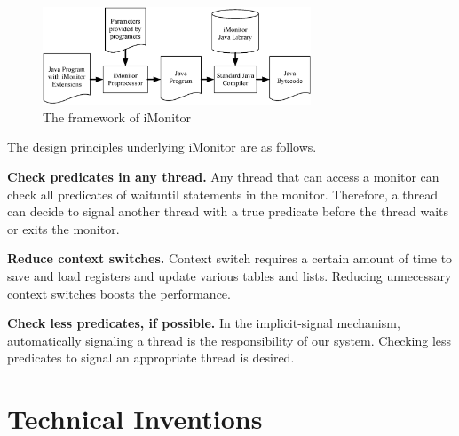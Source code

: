 \documentclass[preprint]{sigplanconf}
\begin{document}
\begin{figure}[ht!]
  \centering
  \includegraphics[width=80mm]{fig/flow.eps}
  \caption{The framework of iMonitor}
  \label{fig:fw}
\end{figure}




The design principles underlying iMonitor are as follows.

\begin{description}
    \item{\bf Check predicates in any thread.} Any thread that can access a
        monitor can check all predicates of waituntil statements in the 
        monitor. Therefore, a thread can decide
        to signal another thread with a true predicate before the thread waits
        or exits the monitor. 
    \item{\bf Reduce context switches.} Context switch requires a certain 
        amount of time to save and load registers and update various tables and
        lists. Reducing unnecessary context switches boosts the performance. 
    \item {\bf Check less predicates, if possible.} In the implicit-signal
        mechanism, automatically signaling a thread is the responsibility of our
        system. Checking less predicates to signal an appropriate thread is
        desired. 
\end{description}

\section{Technical Inventions} \label{sec:tech}
\end{document}
